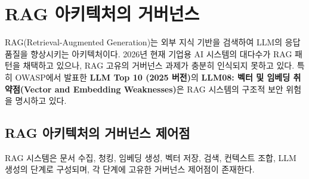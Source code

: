 \section{RAG 아키텍처의 거버넌스}
\label{sec:13.4}

RAG(Retrieval-Augmented Generation)는 외부 지식 기반을 검색하여 LLM의 응답 품질을 향상시키는 아키텍처이다. 2026년 현재 기업용 AI 시스템의 대다수가 RAG 패턴을 채택하고 있으나, RAG 고유의 거버넌스 과제가 충분히 인식되지 못하고 있다. 특히 OWASP\cite{biggio2018wild}에서 발표한 \textbf{LLM Top 10 (2025 버전)}의 \textbf{LLM08: 벡터 및 임베딩 취약점(Vector and Embedding Weaknesses)}은 RAG 시스템의 구조적 보안 위험을 명시하고 있다.

\subsection{RAG 아키텍처의 거버넌스 제어점}
\label{sec:13.4.1}

RAG 시스템은 문서 수집, 청킹, 임베딩 생성, 벡터 저장, 검색, 컨텍스트 조합, LLM 생성의 단계로 구성되며, 각 단계에 고유한 거버넌스 제어점이 존재한다.

